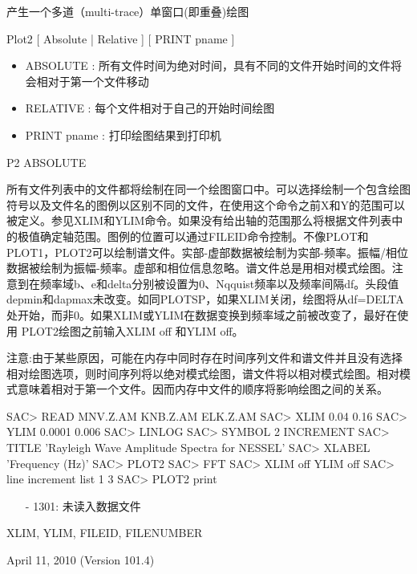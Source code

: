 \label{cmd:plot2}

产生一个多道（multi-trace）单窗口(即重叠)绘图

Plot2 [ Absolute | Relative ] [ PRINT pname ]

\begin{itemize}
\item ABSOLUTE : 所有文件时间为绝对时间，具有不同的文件开始时间的文件将会相对于第一个文件移动 
\item RELATIVE : 每个文件相对于自己的开始时间绘图 
\item PRINT {pname} : 打印绘图结果到打印机 
\end{itemize}

P2 ABSOLUTE

所有文件列表中的文件都将绘制在同一个绘图窗口中。可以选择绘制一个包含绘图符号以及文件名的图例以区别不同的文件，在使用这个命令之前X和Y的范围可以被定义。参见XLIM和YLIM命令。如果没有给出轴的范围那么将根据文件列表中的极值确定轴范围。图例的位置可以通过FILEID命令控制。不像PLOT和PLOT1，PLOT2可以绘制谱文件。实部-虚部数据被绘制为实部-频率。振幅/相位数据被绘制为振幅-频率。虚部和相位信息忽略。谱文件总是用相对模式绘图。注意到在频率域b、e和delta分别被设置为0、Nqquist频率以及频率间隔df。头段值depmin和dapmax未改变。如同PLOTSP，如果XLIM关闭，绘图将从df=DELTA处开始，而非0。如果XLIM或YLIM在数据变换到频率域之前被改变了，最好在使用	PLOT2绘图之前输入XLIM off 和YLIM off。

注意:由于某些原因，可能在内存中同时存在时间序列文件和谱文件并且没有选择相对绘图选项，则时间序列将以绝对模式绘图，谱文件将以相对模式绘图。相对模式意味着相对于第一个文件。因而内存中文件的顺序将影响绘图之间的关系。

\begin{SACCode}
SAC> READ MNV.Z.AM KNB.Z.AM ELK.Z.AM
SAC> XLIM 0.04 0.16
SAC> YLIM 0.0001 0.006
SAC> LINLOG
SAC> SYMBOL 2 INCREMENT
SAC> TITLE 'Rayleigh Wave Amplitude Spectra for NESSEL'
SAC> XLABEL 'Frequency (Hz)'
SAC> PLOT2
SAC> FFT
SAC> XLIM off YLIM off
SAC> line increment list 1 3
SAC> PLOT2 print
\end{SACCode}

\begin{itemize}
\item[-]1301: 未读入数据文件
\end{itemize}

XLIM, YLIM, FILEID, FILENUMBER

April 11, 2010 (Version 101.4)
